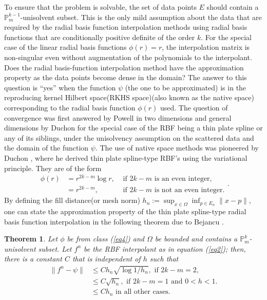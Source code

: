 \documentclass[multixcb]{amstext-l}
\theoremstyle{plain}
\newtheorem{theorem}{Theorem}[chapter]
\theoremstyle{definition}
\theoremstyle{definition}
\theoremstyle{remark}
\numberwithin{equation}{chapter}
\begin{document}
To ensure that the problem is solvable, the set of data points $E$ should contain a $\mathbb{P}^{k-1}_m$-unisolvent subset. This is the only mild assumption about the data that are required by the radial basis function interpolation methods using radial basis functions that are conditionally positive definite of the order $k$. For the special case of the linear radial basis functions $\phi(r) = r$, the interpolation matrix is non-singular even without augmentation of the polynomials to the interpolant. Does the radial basis-function interpolation method have the approximation property as the data points become dense in the domain? The answer to this question is ``yes'' when the function $\psi$ (the one to be approximated) is in the  reproducing kernel Hilbert space(RKHS space)(also known as the native space) corresponding to the radial basis function $\phi(r)$ used. The question of convergence was first answered by Powell \cite{powell1994uniform} in two dimensions and general dimensions by Duchon for the special case of the RBF being a thin plate spline or any of its siblings, under the unisolvency assumption on the scattered data and the domain of the function $\psi$. The use of native space methods was pioneered by Duchon \cite{duchon1976interpolation, duchon1977splines, duchon1978erreur}, where he derived thin plate spline-type RBF's using the variational principle. They are of the form 
\begin{equation}\label{eq4}\begin{aligned}
\phi(r) &= r^{2k-m}\log{r},&\mbox{ if } 2k-m \mbox{ is an even integer,}\\
        &= r^{2k-m},&\mbox{ if } 2k-m \mbox{ is not an even integer.}
        \end{aligned}.
\end{equation}
By defining the fill distance(or mesh norm) $h_n := \sup_{x\in\Omega}\inf_{p\in E_n}\|x-p\|$, one can state the approximation property of the thin plate spline-type radial basis function interpolation in the following theorem due to Bejancu \cite{bejancu1997uniform}.
\begin{theorem}
Let $\phi$ be from class (\ref{eq4}) and $\Omega$ be bounded and contains a $\mathbb{P}^k_m$-unisolvent subset. Let $f^n$ be the RBF interpolant as in equation (\ref{eq2}); then, there is a constant $C$ that is independent of $h$ such that
\begin{equation}\label{eq5}
\begin{aligned}
\|f^n - \psi\| &\le C h_n\sqrt{\log{1/h_n}}, \mbox{   if } 2k-m=2,\\%
            &\le C\sqrt{h_n}, \mbox{   if } 2k-m=1 \mbox{ and } 0<h<1.\\
            &\le C h_n \mbox{ in all other cases.}
        \end{aligned}
\end{equation}
\end{theorem} 
\end{document}

